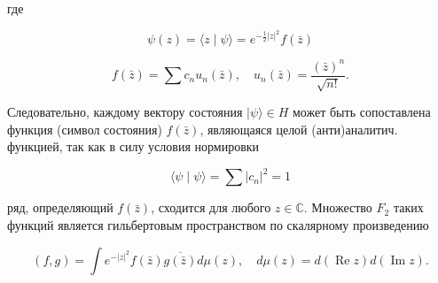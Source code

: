 \documentclass[10pt]{article}
\begin{document}
где



\[

\psi(z)=\langle z \mid \psi\rangle=e^{-\frac{1}{2}|z|^{2}} f(\bar{z})

\]



\[

f(\bar{z})=\sum c_{n} u_{n}(\bar{z}), \quad u_{n}(\bar{z})=\frac{(\bar{z})^{n}}{\sqrt{n !}} .

\]



Следовательно, каждому вектору состояния $|\psi\rangle \in H$ может быть сопоставлена функция (символ состояния) $f(\bar{z})$, являющаяся целой (анти)аналитич. функцией, так как в силу условия нормировки



\[

\langle\psi \mid \psi\rangle=\sum\left|c_{n}\right|^{2}=1

\]



ряд, определяющий $f(\bar{z})$, сходится для любого $z \in \mathbb{C}$. Множество $F_{2}$ таких функций является гильбертовым пространством по скалярному произведению



\[

(f, g)=\int e^{-|z|^{2}} f(\bar{z}) \overline{g(\bar{z})} d \mu(z), \quad d \mu(z)=d(\operatorname{Re} z) d(\operatorname{Im} z) .

\]
\end{document}
